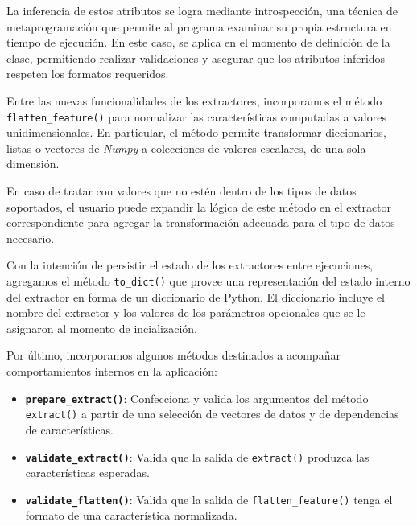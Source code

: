 \begin{description}
    La inferencia de estos atributos se logra mediante introspección, una técnica de metaprogramación que permite al programa examinar su propia estructura en tiempo de ejecución. En este caso, se aplica en el momento de definición de la clase, permitiendo realizar validaciones y asegurar que los atributos inferidos respeten los formatos requeridos.

    \item[Normalización de características] Entre las nuevas funcionalidades de los extractores, incorporamos el método \texttt{flatten\_feature()} para normalizar las características computadas a valores unidimensionales. En particular, el método permite transformar diccionarios, listas o vectores de \emph{Numpy} a colecciones de valores escalares, de una sola dimensión.
    
    En caso de tratar con valores que no estén dentro de los tipos de datos soportados, el usuario puede expandir la lógica de este método en el extractor correspondiente para agregar la transformación adecuada para el tipo de datos necesario.

    \item[Persistencia] Con la intención de persistir el estado de los extractores entre ejecuciones, agregamos el método \texttt{to\_dict()} que provee una representación del estado interno del extractor en forma de un diccionario de Python. El diccionario incluye el nombre del extractor y los valores de los parámetros opcionales que se le asignaron al momento de incialización.

    \item[Método auxiliares] Por último, incorporamos algunos métodos destinados a acompañar comportamientos internos en la aplicación:

    \begin{itemize}
        \item \textbf{\texttt{prepare\_extract()}}: Confecciona y valida los argumentos del método \texttt{extract()} a partir de una selección de vectores de datos y de dependencias de características.
        \item \textbf{\texttt{validate\_extract()}}: Valida que la salida de  \texttt{extract()} produzca las características esperadas.
        \item \textbf{\texttt{validate\_flatten()}}: Valida que la salida de \texttt{flatten\_feature()} tenga el formato de una característica normalizada.
    \end{itemize}
\end{description}

